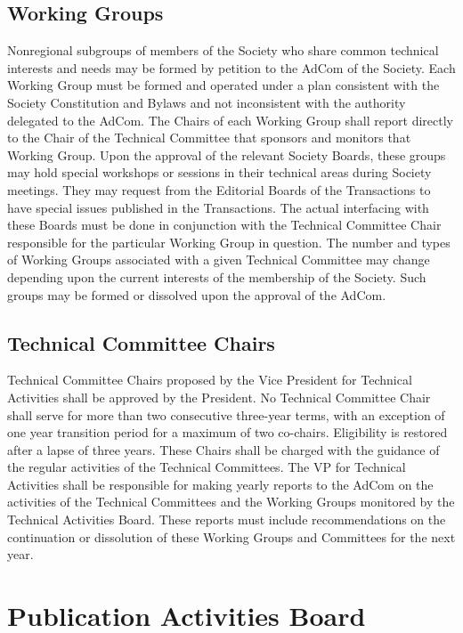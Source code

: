 \documentclass[10pt]{article}
\begin{document}
\subsection{Working Groups}

Nonregional subgroups of members of the Society who share common technical interests and needs may be formed by petition to the AdCom of the Society. Each Working Group must be formed and operated under a plan consistent with the Society Constitution and Bylaws and not inconsistent with the authority delegated to the AdCom. The Chairs of each Working Group shall report directly to the Chair of the Technical Committee that sponsors and monitors that Working Group.  Upon the approval of the relevant Society Boards, these groups may hold special workshops or sessions in their technical areas during Society meetings. They may request from the Editorial Boards of the Transactions to have special issues published in the Transactions. The actual interfacing with these Boards must be done in conjunction with the Technical Committee Chair responsible for the particular Working Group in question. The number and types of Working Groups associated with a given Technical Committee may change depending upon the current interests of the membership of the Society.  Such groups may be formed or dissolved upon the approval of the AdCom.


\subsection{Technical Committee Chairs}

Technical Committee Chairs proposed by the Vice President for Technical Activities shall be approved by the President. No Technical Committee Chair shall serve for more than two consecutive three-year terms, with an exception of one year transition period for a maximum of two co-chairs. Eligibility is restored after a lapse of three years. These Chairs shall be charged with the guidance of the regular activities of the Technical Committees. The VP for Technical Activities shall be responsible for making yearly reports to the AdCom on the activities of the Technical Committees and the Working Groups monitored by the Technical Activities Board. These reports must include recommendations on the continuation or dissolution of these Working Groups and Committees for the next year.


\section{Publication Activities Board}
\label{PAB}
\end{document}
